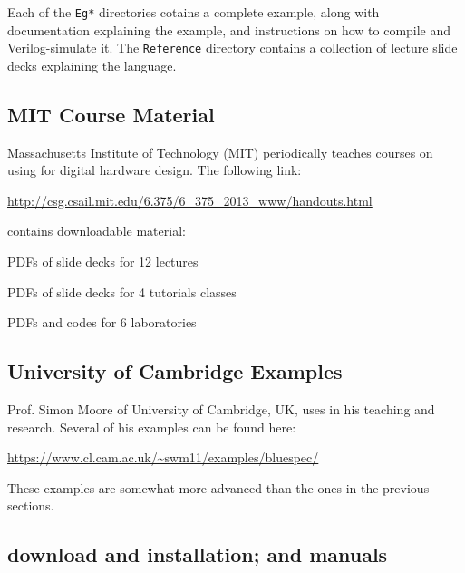 Each of the \verb|Eg*| directories cotains a complete example, along
with documentation explaining the example, and instructions on how to
compile and Verilog-simulate it.  The \verb|Reference| directory
contains a collection of lecture slide decks explaining the {\BSV}
language.


\subsection{MIT Course Material}

Massachusetts Institute of Technology (MIT) periodically teaches
courses on using {\BSV} for digital hardware design.  The following link:

\url{http://csg.csail.mit.edu/6.375/6_375_2013_www/handouts.html}

contains downloadable material:

\begin{tightlist}

  \item PDFs of slide decks for 12 lectures

  \item PDFs of slide decks for 4 tutorials classes

  \item PDFs and codes for 6 laboratories

\end{tightlist}


\subsection{University of Cambridge Examples}

Prof. Simon Moore of University of Cambridge, UK, uses {\BSV} in his
teaching and research.  Several of his {\BSV} examples can be found here:

\url{https://www.cl.cam.ac.uk/~swm11/examples/bluespec/}

These examples are somewhat more advanced than the ones in the
previous sections.


\subsection{{\bsc} download and installation; {\bsc} and {\BSV} manuals}

